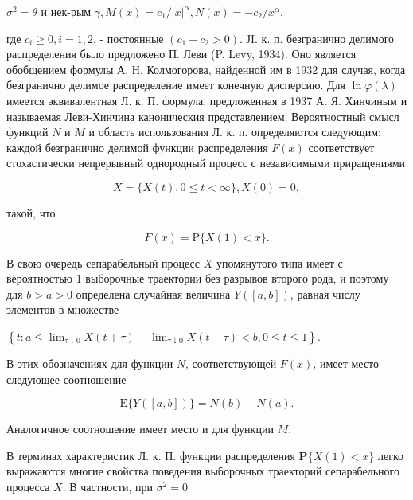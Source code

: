 \documentclass[10pt]{article}
\begin{document}
$\sigma^{2}=\theta$ и нек-рым $\gamma, M(x)=c_{1} /|x|^{\alpha}, N(x)=-c_{2} / x^{\alpha}$,



где $c_{i} \geqslant 0, i=1,2$, - постоянные $\left(c_{1}+c_{2}>0\right)$. ЈI. к. п. безгранично делимого распределения было предложено П. Леви (P. Levy, 1934). Оно является обобщением формулы А. Н. Колмогорова, найденной им в 1932 для случая, когда безгранично делимое распределение имеет конечную дисперсию. Для $\ln \varphi(\lambda)$ имеется әквивалентная Л. к. П. формула, предложенная в 1937 А. Я. Хинчиным и называемая Леви-Хинчина каноническия представлением. Вероятностный смысл функций $N$ и $M$ и область использования Л. к. п. определяются следующим: каждой безгранично делимой функции распределения $F(x)$ соответствует стохастически непрерывный однородный процесс с независимыми приращениями



\[

X=\{X(t), 0 \leqslant t<\infty\}, X(0)=0,

\]



такой, что



\[

F(x)=\mathrm{P}\{X(1)<x\} .

\]



В свою очередь сепарабельный процесс $X$ упомянутого типа имеет с вероятностью 1 выборочные траектории без разрывов второго рода, и поэтому для $b>a>0$ определена случайная величина $Y([a, b])$, равная числу элементов в множестве



$\left\{t: a \leqslant \lim _{\tau \downarrow 0} X(t+\tau)-\lim _{\tau \downarrow 0} X(t-\tau)<b, 0 \leqslant t \leqslant 1\right\}$.



В этих обозначениях для функции $N$, соответствующей $F(x)$, имеет место следующее соотношение



\[

\mathrm{E}\{Y([a, b])\}=N(b)-N(a) .

\]



Аналогичное соотношение имеет место и для функции $M$.



В терминах характеристик Л. к. П. функции распределения $\mathbf{P}\{X(1)<x\}$ легко выражаются многие свойства поведения выборочных траекторий сепарабельного процесса $X$. В частности, при $\sigma^{2}=0$
\end{document}
